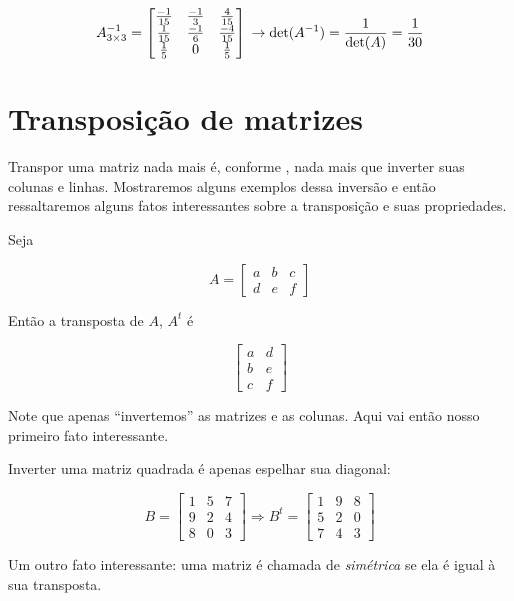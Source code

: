 \documentclass[
  letterpaper,
  DIV=11,
  numbers=noendperiod]{scrreprt}
\begin{document}
\[
A^{-1}_{3\times3} =
\begin{bmatrix}
    \frac{-1}{15} & \frac{-1}{3} & \frac{4}{15}  \\
    \frac{1}{15} & \frac{-1}{6} & \frac{-4}{15} \\
    \frac{1}{5} & 0 & \frac{1}{5} \\
\end{bmatrix}  \\
\rightarrow \det(A^{-1}) = \frac{1}{\det(A)} = \frac{1}{30}
\]

\section{Transposição de matrizes}\label{transposiuxe7uxe3o-de-matrizes}

Transpor uma matriz nada mais é, conforme
\textcite{hartman_matrix_2021}, nada mais que inverter suas colunas e
linhas. Mostraremos alguns exemplos dessa inversão e então ressaltaremos
alguns fatos interessantes sobre a transposição e suas propriedades.

Seja

\[
A = \begin{bmatrix}
    a & b & c \\
    d & e & f
\end{bmatrix}
\]

Então a transposta de \(A\), \(A^{t}\) é

\[
\begin{bmatrix}
    a & d \\
    b & e \\
    c & f
\end{bmatrix}
\]

Note que apenas ``invertemos'' as matrizes e as colunas. Aqui vai então
nosso primeiro fato interessante.

Inverter uma matriz quadrada é apenas espelhar sua diagonal:

\[
B = \begin{bmatrix}
    1 & 5 & 7 \\
    9 & 2 & 4 \\
    8 & 0 & 3
\end{bmatrix} \Rightarrow B^{t} =
\begin{bmatrix}
    1 & 9 & 8 \\
    5 & 2 & 0 \\
    7 & 4 & 3
\end{bmatrix}
\]

Um outro fato interessante: uma matriz é chamada de \emph{simétrica} se
ela é igual à sua transposta.
\end{document}

